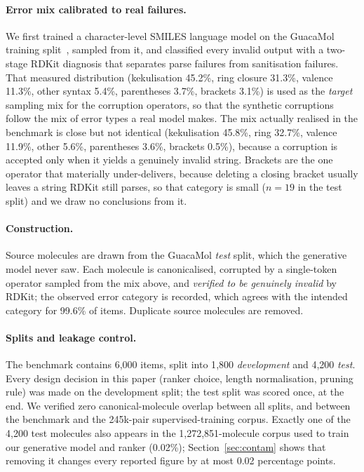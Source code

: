 \documentclass[11pt]{article}
\begin{document}
\paragraph{Error mix calibrated to real failures.}
We first trained a character-level SMILES language model on the GuacaMol
training split~\citep{brown2019guacamol}, sampled from it, and classified every
invalid output with a two-stage RDKit diagnosis that separates parse failures
from sanitisation failures. That measured distribution (kekulisation 45.2\%,
ring closure 31.3\%, valence 11.3\%, other syntax 5.4\%, parentheses 3.7\%,
brackets 3.1\%) is used as the \emph{target} sampling mix for the corruption
operators, so that the synthetic corruptions follow the mix of error types a real
model makes. The mix actually realised in the benchmark is close but not identical
(kekulisation 45.8\%, ring 32.7\%, valence 11.9\%, other 5.6\%, parentheses
3.6\%, brackets 0.5\%), because a corruption is accepted only when it yields a
genuinely invalid string. Brackets are the one operator that materially
under-delivers, because deleting a closing bracket usually leaves a string
RDKit still parses, so that category is small ($n=19$ in the test split) and we
draw no conclusions from it.

\paragraph{Construction.}
Source molecules are drawn from the GuacaMol \emph{test} split, which the
generative model never saw. Each molecule is canonicalised, corrupted by a
single-token operator sampled from the mix above, and \emph{verified to be
genuinely invalid} by RDKit; the observed error category is recorded, which
agrees with the intended category for 99.6\% of items. Duplicate source
molecules are removed.

\paragraph{Splits and leakage control.}
The benchmark contains 6{,}000 items, split into 1{,}800 \emph{development} and
4{,}200 \emph{test}. Every design decision in this paper (ranker choice,
length normalisation, pruning rule) was made on the development split; the
test split was scored once, at the end. We verified zero canonical-molecule
overlap between all splits, and between the benchmark and the 245k-pair
supervised-training corpus. Exactly one of the 4{,}200 test molecules also
appears in the 1{,}272{,}851-molecule corpus used to train our generative model
and ranker (0.02\%); Section~\ref{sec:contam} shows that removing it changes
every reported figure by at most 0.02 percentage points.
\end{document}
